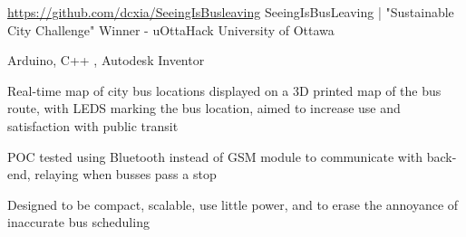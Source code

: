 \begin{cventries}
  \cventry
    {\url{https://github.com/dcxia/SeeingIsBusleaving}} %
    {SeeingIsBusLeaving | "Sustainable City Challenge" Winner - uOttaHack } %
    {University of Ottawa} %
    {} %
    {
      \begin{cvitems} %
        \item {Arduino, C++ , Autodesk Inventor }
        \item {Real-time map of city bus locations displayed on a 3D printed map of the bus route, with LEDS marking the bus location, aimed to increase use and satisfaction with public transit}
        \item {POC tested using Bluetooth instead of GSM module to communicate with back-end, relaying when busses pass a stop}
        \item {Designed to be compact, scalable, use little power, and to erase the annoyance of inaccurate bus scheduling }
      \end{cvitems}
    }

\end{cventries}

